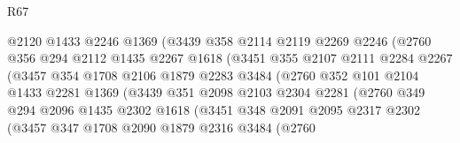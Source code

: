 \begin{lexlean}{R67}
\begin{coremodule}
                          @2120
                          @1433
                          @2246
                          @1369
                          (@3439
                            @358
                            @2114
                            @2119
                            @2269
                            @2246
                            (@2760
                              @356
                              @294
                              @2112
                              @1435
                              @2267
                              @1618
                              (@3451
                                @355
                                @2107
                                @2111
                                @2284
                                @2267
                                (@3457
                                  @354
                                  @1708
                                  @2106
                                  @1879
                                  @2283
                                  @3484
                                  (@2760
                                    @352
                                    @101
                                    @2104
                                    @1433
                                    @2281
                                    @1369
                                    (@3439
                                      @351
                                      @2098
                                      @2103
                                      @2304
                                      @2281
                                      (@2760
                                        @349
                                        @294
                                        @2096
                                        @1435
                                        @2302
                                        @1618
                                        (@3451
                                          @348
                                          @2091
                                          @2095
                                          @2317
                                          @2302
                                          (@3457
                                            @347
                                            @1708
                                            @2090
                                            @1879
                                            @2316
                                            @3484
                                            (@2760

\end{coremodule}
\end{lexlean}
